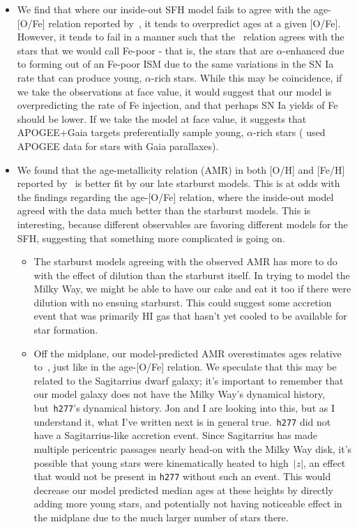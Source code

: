 \documentclass[a4paper, fleqn, usenatbib, useAMS]{mnras}
\begin{document}
\begin{itemize}
	\item We find that where our inside-out SFH model fails to agree with the 
	age-[O/Fe] relation reported by~\citet{Feuillet2019}, it tends to 
	overpredict ages at a given [O/Fe]. However, it tends to fail in a manner 
	such that the~\citet{Feuillet2019} relation agrees with the stars that we 
	would call Fe-poor - that is, the stars that are $\alpha$-enhanced due to 
	forming out of an Fe-poor ISM due to the same variations in the SN Ia rate 
	that can produce young, $\alpha$-rich stars. While this may be coincidence, 
	if we take the observations at face value, it would suggest that our model 
	is overpredicting the rate of Fe injection, and that perhaps SN Ia yields 
	of Fe should be lower. If we take the model at face value, it suggests that 
	APOGEE+Gaia targets preferentially sample young, $\alpha$-rich stars 
	(\citealp{Feuillet2019} used APOGEE data for stars with Gaia parallaxes). 

	\item We found that the age-metallicity relation (AMR) in both [O/H] and 
	[Fe/H] reported by~\citet{Feuillet2019} is better fit by our late 
	starburst models. This is at odds with the findings regarding the 
	age-[O/Fe] relation, where the inside-out model agreed with the data much 
	better than the starburst models. This is interesting, because different 
	observables are favoring different models for the SFH, suggesting that 
	something more complicated is going on. 
	\begin{itemize} 
		\item The starburst models agreeing with the observed AMR has more to 
		do with the effect of dilution than the starburst itself. In trying to 
		model the Milky Way, we might be able to have our cake and eat it too 
		if there were dilution with no ensuing starburst. This could suggest 
		some accretion event that was primarily HI gas that hasn't yet cooled 
		to be available for star formation. 

		\item Off the midplane, our model-predicted AMR overestimates ages 
		relative to~\citet{Feuillet2019}, just like in the age-[O/Fe] relation. 
		We speculate that this may be related to the Sagitarrius dwarf 
		galaxy; it's important to remember that our model galaxy does not have 
		the Milky Way's dynamical history, but~\texttt{h277}'s dynamical 
		history. {\color{red} Jon and I are looking into this, but as I 
		understand it, what I've written next is in general true.}~\texttt{h277} 
		did not have a Sagitarrius-like accretion event. Since Sagitarrius 
		has made multiple pericentric passages nearly head-on with the Milky 
		Way disk, it's possible that young stars were kinematically heated to 
		high~$\left|z\right|$, an effect that would not be present in 
		\texttt{h277} without such an event. This would decrease our model 
		predicted median ages at these heights by directly adding more young 
		stars, and potentially not having noticeable effect in the midplane due 
		to the much larger number of stars there. 
	\end{itemize} 


\end{itemize}
\end{document}

